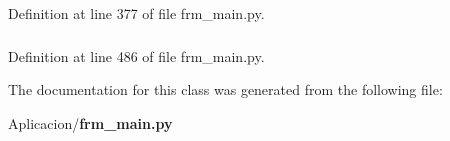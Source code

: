 \-Definition at line 377 of file frm\-\_\-main.\-py.

\subsubsection[{w}]{}\label{class_aplicacion_1_1frm__main_1_1_proc_tle_a76261cc03473963538670404ed4c693e}


\-Definition at line 486 of file frm\-\_\-main.\-py.



\-The documentation for this class was generated from the following file\-:\begin{DoxyCompactItemize}
\item 
\-Aplicacion/{\bf frm\-\_\-main.\-py}\end{DoxyCompactItemize}
